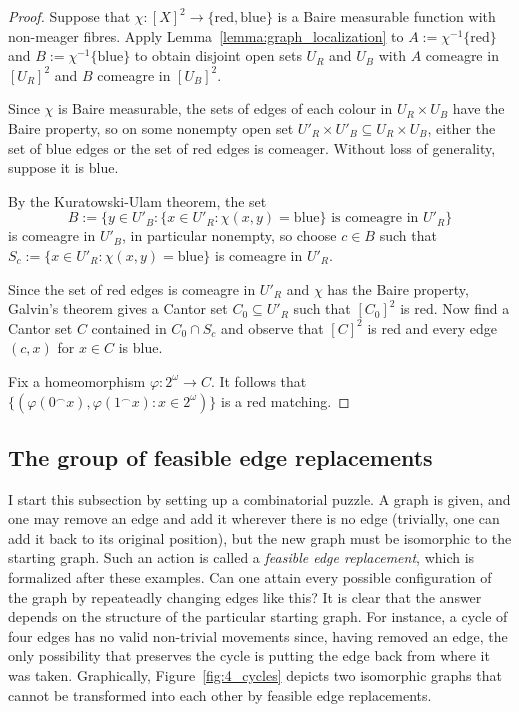 \begin{proof}
    Suppose that $\chi\colon[X]^2\to\{\text{red},\text{blue}\}$ is a Baire measurable function with non-meager fibres.
    Apply Lemma~\ref{lemma:graph_localization} to $A:=\chi^{-1}\{\text{red}\}$ and $B:=\chi^{-1}\{\text{blue}\}$ to obtain disjoint open sets $U_R$ and $U_B$ with $A$ comeagre in $[U_R]^2$ and $B$ comeagre in $[U_B]^2$.

    Since $\chi$ is Baire measurable, the sets of edges of each colour in $U_R\times U_B$ have the Baire property, so on some nonempty open set $U'_R\times U'_B\subseteq U_R\times U_B$, either the set of blue edges or the set of red edges is comeager.
    Without loss of generality, suppose it is blue.

    By the Kuratowski-Ulam theorem, the set $$B:=\{y\in U'_B:\{x\in U'_R:\chi(x,y)=\text{blue}\}\text{ is comeagre in }U'_R\}$$ is comeagre in $U'_B$, in particular nonempty, so choose $c\in B$ such that $S_c:=\{x\in U'_R:\chi(x,y)=\text{blue}\}$ is comeagre in $U'_R$.

    Since the set of red edges is comeagre in $U'_R$ and $\chi$ has the Baire property, Galvin's theorem gives a Cantor set $C_0\subseteq U'_R$ such that $[C_0]^2$ is red.
    Now find a Cantor set $C$ contained in $C_0\cap S_c$ and observe that $[C]^2$ is red and every edge $(c,x)$ for $x\in C$ is blue.

    Fix a homeomorphism $\varphi\colon 2^\omega\to C$.
    It follows that $\{(\varphi(0^\frown x),\varphi(1^\frown x):x\in 2^\omega)\}$ is a red matching.
\end{proof}

\subsection{The group of feasible edge replacements}\label{subsec:fer}

I start this subsection by setting up a combinatorial puzzle.
A graph is given, and one may remove an edge and add it wherever there is no edge (trivially, one can add it back to its original position), but the new graph must be isomorphic to the starting graph.
Such an action is called a \emph{feasible edge replacement}, which is formalized after these examples.
Can one attain every possible configuration of the graph by repeateadly changing edges like this?
It is clear that the answer depends on the structure of the particular starting graph.
For instance, a cycle of four edges has no valid non-trivial movements since, having removed an edge, the only possibility that preserves the cycle is putting the edge back from where it was taken.
Graphically, Figure~\ref{fig:4_cycles} depicts two isomorphic graphs that cannot be transformed into each other by feasible edge replacements.

